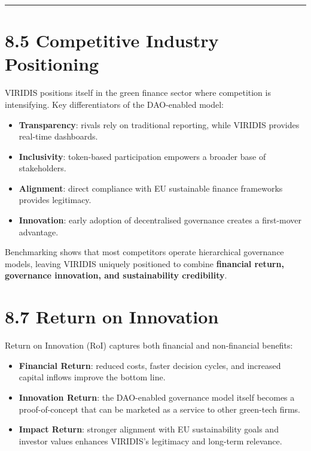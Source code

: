 \documentclass[
  english,
  12pt,
  oneside,
  open=any]{scrbook}
\providecommand{\tightlist}{%
  \setlength{\itemsep}{0pt}\setlength{\parskip}{0pt}}\usepackage{longtable,booktabs,array}
\begin{document}
\begin{center}\rule{0.5\linewidth}{0.5pt}\end{center}

\section{8.5 Competitive Industry Positioning}\label{sec-competitive}

VIRIDIS positions itself in the green finance sector where competition
is intensifying. Key differentiators of the DAO-enabled model:

\begin{itemize}
\tightlist
\item
  \textbf{Transparency}: rivals rely on traditional reporting, while
  VIRIDIS provides real-time dashboards.\\
\item
  \textbf{Inclusivity}: token-based participation empowers a broader
  base of stakeholders.\\
\item
  \textbf{Alignment}: direct compliance with EU sustainable finance
  frameworks provides legitimacy.\\
\item
  \textbf{Innovation}: early adoption of decentralised governance
  creates a first-mover advantage.
\end{itemize}

Benchmarking shows that most competitors operate hierarchical governance
models, leaving VIRIDIS uniquely positioned to combine \textbf{financial
return, governance innovation, and sustainability credibility}.

\section{8.7 Return on Innovation}\label{sec-roi}

Return on Innovation (RoI) captures both financial and non-financial
benefits:

\begin{itemize}
\tightlist
\item
  \textbf{Financial Return}: reduced costs, faster decision cycles, and
  increased capital inflows improve the bottom line.\\
\item
  \textbf{Innovation Return}: the DAO-enabled governance model itself
  becomes a proof-of-concept that can be marketed as a service to other
  green-tech firms.\\
\item
  \textbf{Impact Return}: stronger alignment with EU sustainability
  goals and investor values enhances VIRIDIS's legitimacy and long-term
  relevance.
\end{itemize}
\end{document}
